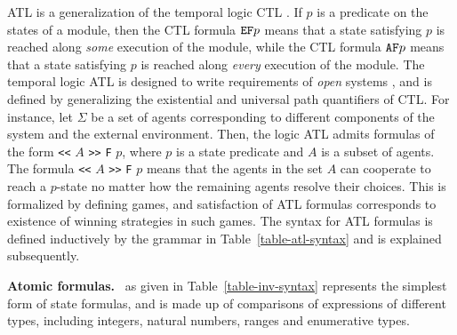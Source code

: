 ATL is a generalization of the temporal logic CTL \cite{ClarkeEmerson81}.
If $p$ is a predicate on the states of a module, then
the CTL formula ${\tt E} {\tt F} p$ means that a state satisfying
$p$ is reached along {\em some} execution of the module, while
the CTL formula ${\tt A} {\tt F} p$ means that a state satisfying
$p$ is reached along {\em every} execution of the module.
The temporal logic ATL is 
designed to write requirements of {\em open\/}
systems \cite{AHK97}, and is
defined by generalizing the existential
and universal path quantifiers of CTL.
For instance, let $\Sigma$ be a set of agents
corresponding to different components of the system and the external
environment.  Then, the logic ATL admits formulas of the form
{\tt <<} $A$ {\tt >>} {\tt F} $p$, where $p$ is a state predicate and $A$ is a subset of
agents.  The formula {\tt <<} $A$ {\tt >>} {\tt F} $p$ means that the agents in the set $A$
can cooperate to reach a $p$-state no matter how the remaining agents
resolve their choices.  This is formalized by defining games, and
satisfaction of ATL formulas corresponds to existence of winning
strategies in such games.
The syntax for ATL formulas is defined inductively by the grammar in Table~\ref{table-atl-syntax}
and is explained subsequently.

\mypar
{\bf Atomic formulas.}
\atomicProp\ as given in Table~\ref{table-inv-syntax} represents the simplest form of state formulas,
and is made up of comparisons of expressions of different
types, including integers, natural numbers, ranges and enumerative types. 

